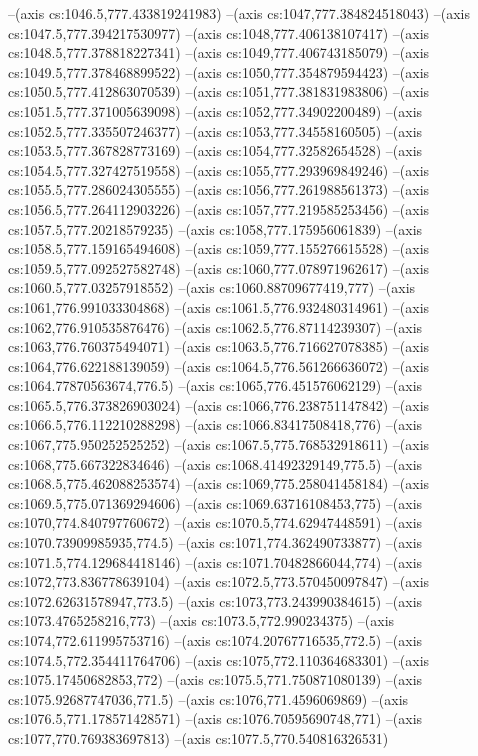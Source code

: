 --(axis cs:1046.5,777.433819241983)
--(axis cs:1047,777.384824518043)
--(axis cs:1047.5,777.394217530977)
--(axis cs:1048,777.406138107417)
--(axis cs:1048.5,777.378818227341)
--(axis cs:1049,777.406743185079)
--(axis cs:1049.5,777.378468899522)
--(axis cs:1050,777.354879594423)
--(axis cs:1050.5,777.412863070539)
--(axis cs:1051,777.381831983806)
--(axis cs:1051.5,777.371005639098)
--(axis cs:1052,777.34902200489)
--(axis cs:1052.5,777.335507246377)
--(axis cs:1053,777.34558160505)
--(axis cs:1053.5,777.367828773169)
--(axis cs:1054,777.32582654528)
--(axis cs:1054.5,777.327427519558)
--(axis cs:1055,777.293969849246)
--(axis cs:1055.5,777.286024305555)
--(axis cs:1056,777.261988561373)
--(axis cs:1056.5,777.264112903226)
--(axis cs:1057,777.219585253456)
--(axis cs:1057.5,777.20218579235)
--(axis cs:1058,777.175956061839)
--(axis cs:1058.5,777.159165494608)
--(axis cs:1059,777.155276615528)
--(axis cs:1059.5,777.092527582748)
--(axis cs:1060,777.078971962617)
--(axis cs:1060.5,777.03257918552)
--(axis cs:1060.88709677419,777)
--(axis cs:1061,776.991033304868)
--(axis cs:1061.5,776.932480314961)
--(axis cs:1062,776.910535876476)
--(axis cs:1062.5,776.87114239307)
--(axis cs:1063,776.760375494071)
--(axis cs:1063.5,776.716627078385)
--(axis cs:1064,776.622188139059)
--(axis cs:1064.5,776.561266636072)
--(axis cs:1064.77870563674,776.5)
--(axis cs:1065,776.451576062129)
--(axis cs:1065.5,776.373826903024)
--(axis cs:1066,776.238751147842)
--(axis cs:1066.5,776.112210288298)
--(axis cs:1066.83417508418,776)
--(axis cs:1067,775.950252525252)
--(axis cs:1067.5,775.768532918611)
--(axis cs:1068,775.667322834646)
--(axis cs:1068.41492329149,775.5)
--(axis cs:1068.5,775.462088253574)
--(axis cs:1069,775.258041458184)
--(axis cs:1069.5,775.071369294606)
--(axis cs:1069.63716108453,775)
--(axis cs:1070,774.840797760672)
--(axis cs:1070.5,774.62947448591)
--(axis cs:1070.73909985935,774.5)
--(axis cs:1071,774.362490733877)
--(axis cs:1071.5,774.129684418146)
--(axis cs:1071.70482866044,774)
--(axis cs:1072,773.836778639104)
--(axis cs:1072.5,773.570450097847)
--(axis cs:1072.62631578947,773.5)
--(axis cs:1073,773.243990384615)
--(axis cs:1073.4765258216,773)
--(axis cs:1073.5,772.990234375)
--(axis cs:1074,772.611995753716)
--(axis cs:1074.20767716535,772.5)
--(axis cs:1074.5,772.354411764706)
--(axis cs:1075,772.110364683301)
--(axis cs:1075.17450682853,772)
--(axis cs:1075.5,771.750871080139)
--(axis cs:1075.92687747036,771.5)
--(axis cs:1076,771.4596069869)
--(axis cs:1076.5,771.178571428571)
--(axis cs:1076.70595690748,771)
--(axis cs:1077,770.769383697813)
--(axis cs:1077.5,770.540816326531)
